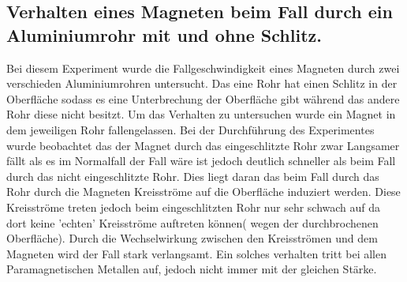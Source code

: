\subsection{Verhalten eines Magneten beim Fall durch ein Aluminiumrohr mit und ohne Schlitz.}

Bei diesem Experiment wurde die Fallgeschwindigkeit eines Magneten durch 
zwei verschieden Aluminiumrohren untersucht.
Das eine Rohr hat einen Schlitz in der Oberfläche sodass es eine Unterbrechung der Oberfläche gibt während das andere Rohr diese nicht besitzt.
Um das Verhalten zu untersuchen wurde ein Magnet in dem jeweiligen Rohr fallengelassen.
Bei der Durchführung des Experimentes wurde beobachtet das der Magnet durch das eingeschlitzte Rohr zwar Langsamer fällt als es im Normalfall 
der Fall wäre ist jedoch deutlich schneller als beim Fall durch das nicht eingeschlitzte Rohr.
Dies liegt daran das beim Fall durch das Rohr durch die Magneten Kreisströme auf die Oberfläche induziert werden.
Diese Kreisströme treten jedoch beim eingeschlitzten Rohr nur sehr schwach auf da dort keine 'echten' Kreisströme auftreten können( wegen der durchbrochenen Oberfläche).
Durch die Wechselwirkung zwischen den Kreisströmen und dem Magneten wird der Fall stark verlangsamt. 
Ein solches verhalten tritt bei allen Paramagnetischen Metallen auf, jedoch nicht immer mit der gleichen Stärke. 

